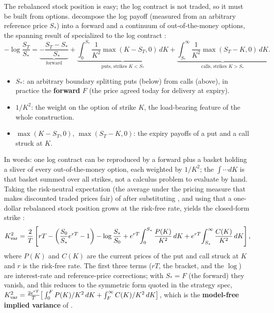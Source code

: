 The rebalanced stock position is easy; the log contract is not traded, so it must be built from options. \citet{Demeterfi1999} decompose the log payoff (measured from an arbitrary reference price $S_*$) into a forward and a continuum of out-of-the-money options, the spanning result of \citet{CarrMadan2002} specialized to the log contract \citep[Eq.~25, p.~18]{Demeterfi1999}:
\begin{equation}
\label{eq:gsvivs:strip}
-\log\frac{S_T}{S_*}
= \underbrace{-\frac{S_T - S_*}{S_*}}_{\text{forward}}
+ \underbrace{\int_0^{S_*}\frac{1}{K^2}\max(K - S_T,0)\,dK}_{\text{puts, strikes }K<S_*}
+ \underbrace{\int_{S_*}^{\infty}\frac{1}{K^2}\max(S_T - K,0)\,dK}_{\text{calls, strikes }K>S_*}.
\end{equation}
\begin{itemize}
  \item $S_*$: an arbitrary boundary splitting puts (below) from calls (above), in practice the \textbf{forward} $F$ (the price agreed today for delivery at expiry).
  \item $1/K^2$: the weight on the option of strike $K$, the load-bearing feature of the whole construction.
  \item $\max(K-S_T,0)$, $\max(S_T-K,0)$: the expiry payoffs of a put and a call struck at $K$.
\end{itemize}
In words: one log contract can be reproduced by a forward plus a basket holding a sliver of every out-of-the-money option, each weighted by $1/K^2$; the $\int\!\cdots dK$ is that basket summed over all strikes, not a calculus problem to evaluate by hand. Taking the risk-neutral expectation (the average under the pricing measure that makes discounted traded prices fair) of  after substituting , and using that a one-dollar rebalanced stock position grows at the risk-free rate, yields the closed-form strike \citep[Eq.~26, p.~19]{Demeterfi1999}:
\begin{equation}
\label{eq:gsvivs:kvar}
K_{\mathrm{var}}^2 = \frac{2}{T}\left[ rT - \left(\frac{S_0}{S_*}e^{rT} - 1\right) - \log\frac{S_*}{S_0} + e^{rT}\!\int_0^{S_*}\frac{P(K)}{K^2}\,dK + e^{rT}\!\int_{S_*}^{\infty}\frac{C(K)}{K^2}\,dK \right],
\end{equation}
where $P(K)$ and $C(K)$ are the current prices of the put and call struck at $K$ and $r$ is the risk-free rate. The first three terms ($rT$, the bracket, and the $\log$) are interest-rate and reference-price corrections; with $S_* = F$ (the forward) they vanish, and this reduces to the symmetric form quoted in the strategy spec, $K_{\mathrm{var}}^2 = \frac{2e^{rT}}{T}\big[\int_0^F P(K)/K^2\,dK + \int_F^\infty C(K)/K^2\,dK\big]$, which is the \textbf{model-free implied variance} of .

